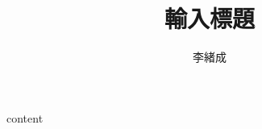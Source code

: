 \documentclass[a4paper, 12pt]{article}
\title{輸入標題}
\author{李緒成}
\begin{document}
    content
\end{document}
